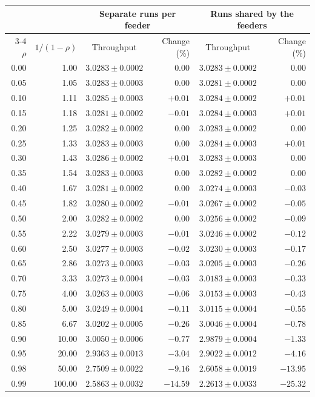 \begin{tabular}{rrcrcr}
\hline
 & & \multicolumn{2}{c}{Separate runs per feeder} & \multicolumn{2}{c}{Runs shared by the feeders} \\
\cline{3-4}\cline{5-6}
$\rho$ & $1/(1-\rho)$ & Throughput & Change (\%) & Throughput & Change (\%) \\ \hline
0.00 & 1.00 & $3.0283\pm0.0002$ & $0.00$ & $3.0283\pm0.0002$ & $0.00$ \\
0.05 & 1.05 & $3.0283\pm0.0003$ & $0.00$ & $3.0281\pm0.0002$ & $0.00$ \\
0.10 & 1.11 & $3.0285\pm0.0003$ & $+0.01$ & $3.0284\pm0.0002$ & $+0.01$ \\
0.15 & 1.18 & $3.0281\pm0.0002$ & $-0.01$ & $3.0284\pm0.0003$ & $+0.01$ \\
0.20 & 1.25 & $3.0282\pm0.0002$ & $0.00$ & $3.0283\pm0.0002$ & $0.00$ \\
0.25 & 1.33 & $3.0283\pm0.0003$ & $0.00$ & $3.0284\pm0.0003$ & $+0.01$ \\
0.30 & 1.43 & $3.0286\pm0.0002$ & $+0.01$ & $3.0283\pm0.0003$ & $0.00$ \\
0.35 & 1.54 & $3.0283\pm0.0003$ & $0.00$ & $3.0282\pm0.0002$ & $0.00$ \\
0.40 & 1.67 & $3.0281\pm0.0002$ & $0.00$ & $3.0274\pm0.0003$ & $-0.03$ \\
0.45 & 1.82 & $3.0280\pm0.0002$ & $-0.01$ & $3.0267\pm0.0002$ & $-0.05$ \\
0.50 & 2.00 & $3.0282\pm0.0002$ & $0.00$ & $3.0256\pm0.0002$ & $-0.09$ \\
0.55 & 2.22 & $3.0279\pm0.0003$ & $-0.01$ & $3.0246\pm0.0002$ & $-0.12$ \\
0.60 & 2.50 & $3.0277\pm0.0003$ & $-0.02$ & $3.0230\pm0.0003$ & $-0.17$ \\
0.65 & 2.86 & $3.0273\pm0.0003$ & $-0.03$ & $3.0205\pm0.0003$ & $-0.26$ \\
0.70 & 3.33 & $3.0273\pm0.0004$ & $-0.03$ & $3.0183\pm0.0003$ & $-0.33$ \\
0.75 & 4.00 & $3.0263\pm0.0003$ & $-0.06$ & $3.0153\pm0.0003$ & $-0.43$ \\
0.80 & 5.00 & $3.0249\pm0.0004$ & $-0.11$ & $3.0115\pm0.0004$ & $-0.55$ \\
0.85 & 6.67 & $3.0202\pm0.0005$ & $-0.26$ & $3.0046\pm0.0004$ & $-0.78$ \\
0.90 & 10.00 & $3.0050\pm0.0006$ & $-0.77$ & $2.9879\pm0.0004$ & $-1.33$ \\
0.95 & 20.00 & $2.9363\pm0.0013$ & $-3.04$ & $2.9022\pm0.0012$ & $-4.16$ \\
0.98 & 50.00 & $2.7509\pm0.0022$ & $-9.16$ & $2.6058\pm0.0019$ & $-13.95$ \\
0.99 & 100.00 & $2.5863\pm0.0032$ & $-14.59$ & $2.2613\pm0.0033$ & $-25.32$ \\
\hline
\end{tabular}
